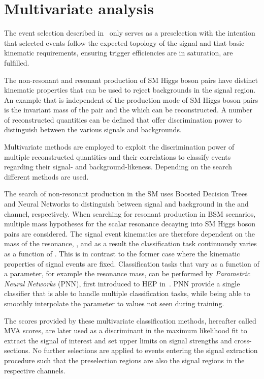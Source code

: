 \section{Multivariate analysis}

The event selection described in~ only
serves as a preselection with the intention that selected events
follow the expected topology of the signal and that basic kinematic
requirements, ensuring trigger efficiencies are in saturation, are
fulfilled.

The non-resonant and resonant production of SM Higgs boson pairs have
distinct kinematic properties that can be used to reject backgrounds
in the signal region. An example that is independent of the production
mode of SM Higgs boson pairs is the invariant mass of the \bbbar pair
and the \hadhad which can be reconstructed. A number of reconstructed
quantities can be defined that offer discrimination power to
distinguish between the various signals and backgrounds.

Multivariate methods are employed to exploit the discrimination power
of multiple reconstructed quantities and their correlations to
classify events regarding their signal- and
background-likeness. Depending on the search different methods are
used.

The search of non-resonant \HH production in the SM uses Boosted
Decision Trees and Neural Networks to distinguish between signal and
background in the \hadhad and \lephad channel, respectively. When
searching for resonant \HH production in BSM scenarios, multiple mass
hypotheses for the scalar resonance decaying into SM Higgs boson pairs
are considered. The signal event kinematics are therefore dependent on
the mass of the resonance, \mX, and as a result the classification
task continuously varies as a function of \mX. This is in contrast to
the former case where the kinematic properties of signal events are
fixed. Classification tasks that vary as a function of a parameter,
for example the resonance mass, can be performed by \emph{Parametric
  Neural Networks} (PNN), first introduced to HEP
in~\cite{Baldi:2016fzo}. PNN provide a single classifier that is able
to handle multiple classification tasks, while being able to smoothly
interpolate the parameter to values not seen during training.

The scores provided by these multivariate classification methods,
hereafter called MVA scores, are later used as a discriminant in the
maximum likelihood fit to extract the signal of interest and set upper
limits on signal strengths and cross-sections. No further selections
are applied to events entering the signal extraction procedure such
that the preselection regions are also the signal regions in the
respective channels.

